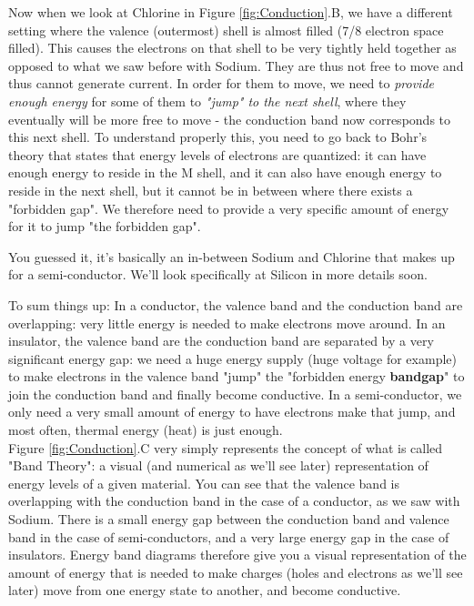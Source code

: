 Now when we look at Chlorine in Figure \ref{fig:Conduction}.B, we have a different setting where the valence (outermost) shell is almost filled (7/8 electron space filled). This causes the electrons on that shell to be very tightly held together as opposed to what we saw before with Sodium. They are thus not free to move and thus cannot generate current. In order for them to move, we need to \textit{provide enough energy} for some of them to \textit{"jump" to the next shell}, where they eventually will be more free to move - the conduction band now corresponds to this next shell. To understand properly this, you need to go back to Bohr's theory that states that energy levels of electrons are quantized: it can have enough energy to reside in the M shell, and it can also have enough energy to reside in the next shell, but it cannot be in between where there exists a "forbidden gap". We therefore need to provide a very specific amount of energy for it to jump "the forbidden gap".   

You guessed it, it's basically an in-between Sodium and Chlorine that makes up for a semi-conductor. We'll look specifically at Silicon in more details soon.  

To sum things up: In a conductor, the valence band and the conduction band are overlapping: very little energy is needed to make electrons move around. In an insulator, the valence band are the conduction band are separated by a very significant energy gap: we need a huge energy supply (huge voltage for example) to make electrons in the valence band "jump" the "forbidden energy \textbf{bandgap}" to join the conduction band and finally become conductive. In a semi-conductor, we only need a very small amount of energy to have electrons make that jump, and most often, thermal energy (heat) is just enough. \\

Figure \ref{fig:Conduction}.C very simply represents the concept of what is called "Band Theory": a visual (and numerical as we'll see later) representation of energy levels of a given material. You can see that the valence band is overlapping with the conduction band in the case of a conductor, as we saw with Sodium. There is a small energy gap between the conduction band and valence band in the case of semi-conductors, and a very large energy gap in the case of insulators. Energy band diagrams therefore give you a visual representation of the amount of energy that is needed to make charges (holes and electrons as we'll see later) move from one energy state to another, and become conductive. 

